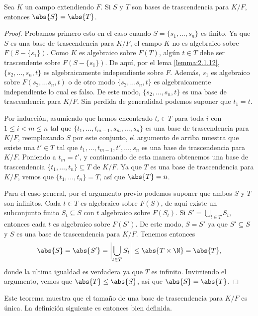 \begin{theorem}
  Sea $K$ un campo extendiendo $F$. Si $S$ y $T$ son bases de trascendencia para $K/F$, entonces $\abs{S} = \abs{T}$.
\end{theorem}
\begin{proof}
  Probamos primero esto en el caso cuando $S = \{s_1, \ldots, s_n\}$ es finito. Ya que $S$ es una base de trascendencia para $K/F$, el campo $K$ no es algebraico sobre $F(S - \{s_1\})$. Como $K$ es algebraico sobre $F(T)$, algún $t \in T$ debe ser trascendente sobre $F(S - \{s_1\})$. De aquí, por el lema \ref{lemma:2.1.12}, $\{s_2, \ldots, s_n, t\}$ es algebraicamente independiente sobre $F$. Además, $s_1$ es algebraico sobre $F(s_2,\ldots s_n, t)$ o de otro modo $\{s_2,\ldots s_n, t\}$ es algebraicamente independiente lo cual es falso. De este modo, $\{s_2, \ldots, s_n, t\}$ es una base de trascendencia para $K/F$. Sin perdida de generalidad podemos suponer que $t_1 = t$.

  Por inducción, asumiendo que hemos encontrado $t_i \in T$ para toda $i$ con $1 \leq i < m \leq n$ tal que $\{t_1, \ldots, t_{m-1}, s_m, \ldots, s_n\}$ es una base de trascendencia para $K/F$, reemplazando $S$ por este conjunto, el argumento de arriba muestra que existe una $t' \in T$ tal que $t_1, \ldots, t_{m-1}, t', \ldots, s_n$ es una base de trascendencia para $K/F$. Poniendo a $t_m = t'$, y continuando de esta manera obtenemos una base de trascendencia $\{t_1, \ldots, t_n\} \subseteq T $ de $K/F$. Ya que $T$ es una base de trascendencia para $K/F$, vemos que $\{t_1, \ldots, t_n\} = T $, así que $\abs{T} = n$.

  Para el caso general, por el argumento previo podemos suponer que ambos $S$ y $T$ son infinitos. Cada $t \in T$ es algebraico sobre $F(S)$, de aquí existe un subconjunto finito $S_t \subseteq S$ con $t$ algebraico sobre $F(S_t)$. Si $S' = \bigcup_{t\in T} S_t$, entonces cada $t$ es algebraico sobre $F(S')$. De este modo, $S = S'$ ya que $S' \subseteq S$ y $S$ es una base de trascendencia para $K/F$. Tenemos entonces
  \[
    \abs{S} = \abs{S'} = \biggl| \bigcup_{t \in T} S_t \biggr| \leq \abs{T \times \N} = \abs{T},
  \]
  donde la ultima igualdad es verdadera ya que $T$ es infinito. Invirtiendo el argumento, vemos que $\abs{T} \leq \abs{S}$, así que $\abs{S} = \abs{T}$.
\end{proof}

Este teorema muestra que el tamaño de una base de trascendencia para $K/F$ es única. La definición siguiente es entonces bien definida.

